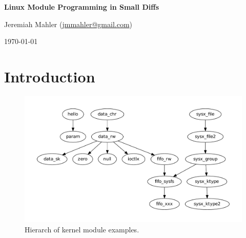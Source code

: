 \documentclass{article}
\begin{document}
\VerbatimFootnotes



\thispagestyle{empty}

\centerline{\Large \textbf{Linux Module Programming in Small Diffs}}
\vspace{0.1in}
\centerline{\normalsize {Jeremiah Mahler} ({\href{mailto:jmmahler@gmail.com}{jmmahler@gmail.com}})}
\centerline{\small \today}
\vspace{0.2in}





\tableofcontents
\pagebreak

\section{Introduction}

\nocite{corbet2009linux}
\nocite{venkateswaran2008essential}
\nocite{love2010linux}
\nocite{love2013linux}

\begin{figure}[h!]
\begin{center}
\includegraphics[scale=0.6]{hierarchy/hier}
\end{center}
\caption{Hierarch of kernel module examples.}\label{fig:hier}
\end{figure}
\end{document}
